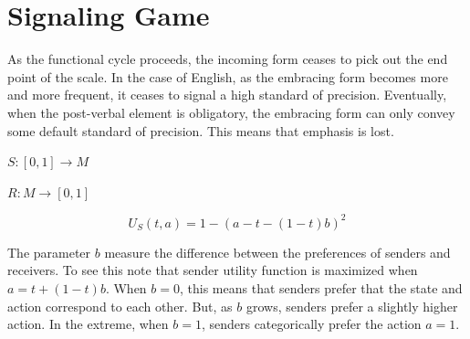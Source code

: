 \documentclass[12pt]{upenndiss}
\theoremstyle{definition} \newtheorem{definition}{Definition}
\begin{document}


\section{Signaling Game}


As the functional cycle proceeds, the incoming form ceases to pick out the end point of the scale. In the case of English, as the embracing form becomes more and more frequent, it ceases to signal a high standard of precision. Eventually, when the post-verbal element is obligatory, the embracing form can only convey some default standard of precision. This means that emphasis is lost. 


$S : [0,1] \rightarrow M$ 

$R : M \rightarrow [0,1]$




\begin{equation}
     U_S(t, a) = 1 - (a - t - (1-t)b)^2
\end{equation}

The parameter $b$ measure the difference between the preferences of senders and receivers. To see this note that sender utility function is maximized when $a = t + (1-t)b$. When $b=0$, this means that senders prefer that the state and action correspond to each other. But, as $b$ grows, senders prefer a slightly higher action. In the extreme, when $b=1$, senders categorically prefer the action $a=1$.
\end{document}
